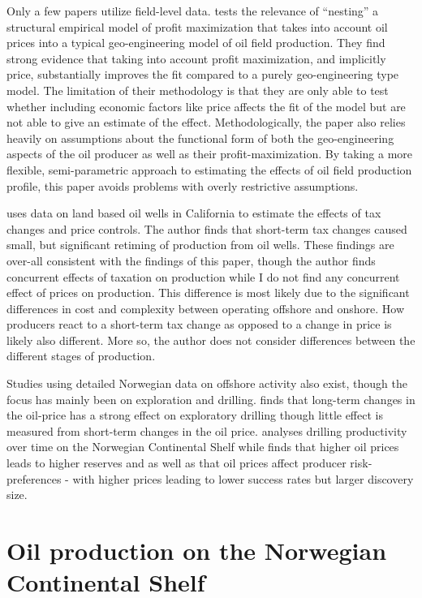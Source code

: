\documentclass[12pt]{article}
\begin{document}
Only a few papers utilize field-level data.  \citet{black_is_1998} tests the relevance of “nesting” a structural empirical model of profit maximization that takes into account oil prices into a typical geo-engineering model of oil field production.  They find strong evidence that taking into account profit maximization, and implicitly price, substantially improves the fit compared to a purely geo-engineering type model.   The limitation of their methodology is that they are only able to test whether including economic factors like price affects the fit of the model but are not able to give an estimate of the effect.  Methodologically, the paper also relies heavily on assumptions about the functional form of both the geo-engineering aspects of the oil producer as well as their profit-maximization.  By taking a more flexible, semi-parametric approach to estimating the effects of oil field production profile, this paper avoids problems with overly restrictive assumptions. 

\citet{rao_taxation_2010} uses data on land based oil wells in California to estimate the effects of tax changes and price controls.  The author finds that short-term tax changes caused small, but significant retiming of production from oil wells.  These findings are over-all consistent with the findings of this paper, though the author finds concurrent effects of taxation on production while I do not find any concurrent effect of prices on production.  This difference is most likely due to the significant differences in cost and complexity between operating offshore and onshore.  How producers react to a short-term tax change as opposed to a change in price is likely also different.  More so, the author does not consider differences between the different stages of production.   

Studies using detailed Norwegian data on offshore activity also exist, though the focus has mainly been on exploration and drilling.  \citet{mohn_exploration_2008} finds that long-term changes in the oil-price has a strong effect on exploratory drilling though little effect is measured from short-term changes in the oil price.  \citet{osmundsen_exploration_2010} analyses drilling productivity over time on the Norwegian Continental Shelf while \citet{mohn_efforts_2008} finds that higher oil prices leads to higher reserves and as well as that oil prices affect producer risk-preferences - with higher prices leading to lower success rates but larger discovery size.  


\section{Oil production on the Norwegian Continental Shelf}
\end{document}

